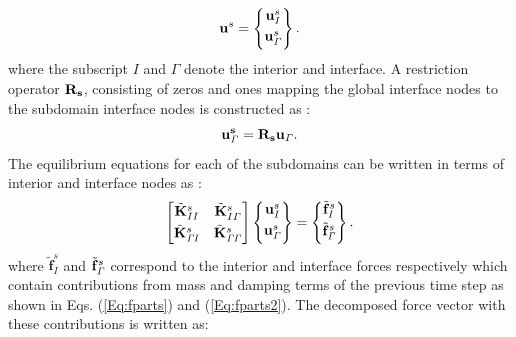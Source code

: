 \documentclass{article}
\begin{document}
\begin{equation}
\mathbf{u}^s =
\begin{Bmatrix}
     {\bf{u}}_{I}^s
\\[0.3em]
     {\bf{u}}_{{\it{\Gamma}}}^s
\\[0.3em]
\end{Bmatrix}.
\end{equation}
where the subscript $I$ and $\Gamma$ denote the interior and interface. A restriction operator $\bf{R}_{s}$, consisting of zeros and ones mapping the global interface nodes to the subdomain interface nodes is constructed as \cite{subber_thesis}:
\begin{equation}
\bf{u}_{\it{\Gamma}}^s = \bf{R}_{s} {u}_{\it{\Gamma}}.
\end{equation}
The equilibrium equations for each of the subdomains can be written in terms of interior and interface nodes as \cite{subber_thesis}:
\begin{equation}
{\begin{bmatrix}
    {\tilde{\mathbf{K}}}_{II}^s & {\tilde{\mathbf{K}}}_{I \it{\Gamma}}^s
\\[0.3em]
     {\tilde{\mathbf{K}}}_{\it{\Gamma} I}^s & {\tilde{\mathbf{K}}}_{\it{\Gamma} \it{\Gamma}}^s
\end{bmatrix}}
\begin{Bmatrix}
     {\mathbf{u}}_{I}^s
\\[0.3em]
     \mathbf{u}_{\it{\Gamma}}^s
\\[0.3em]
\end{Bmatrix}  =
\begin{Bmatrix}
     \tilde{\mathbf{f}}_{I}^s
\\[0.3em]
     \tilde{\mathbf{f}}_{\it{\Gamma}}^s
\\[0.3em]
\end{Bmatrix}.
\end{equation}
where $ \tilde{\mathbf{f}}_{I}^s$ and $\tilde{\mathbf{f}}_{\it{\Gamma}}^s$ correspond to the interior and interface forces respectively which contain contributions from mass and damping terms of the previous time step as shown in Eqs. (\ref{Eq:fparts}) and (\ref{Eq:fparts2}). The decomposed force vector with these contributions is written as:
\end{document}
